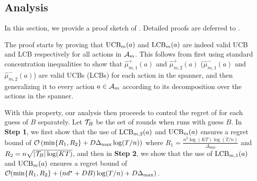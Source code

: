 \subsection{Analysis}\label{sec: alg}
In this section, we provide a proof sketch of . Detailed proofs are deferred to .

The proof starts by proving that ${\operatorname{UCB}}_m(a)$ and ${\operatorname{LCB}}_m(a)$ are indeed valid UCB and LCB respectively for all actions in ${\mathcal{A}}_m$. 
This follows from first using standard concentration inequalities to show that $\hat{\mu}_{m,1}^+(a)$ and $\hat{\mu}_{m,2}^+(a)$ ($\hat{\mu}_{m,1}^-(a)$ and $\hat{\mu}_{m,2}^-(a)$) are valid UCBs (LCBs) for each action in the spanner, 
and then generalizing it to every action $a \in {\mathcal{A}}_m$ according to its decomposition over the actions in the spanner.

With this property, our analysis then proceeds to control the regret of  for each guess of $B$ separately. Let ${\mathcal{T}}_B$ be the set of rounds when  runs with guess $B$. 
In \textbf{Step 1}, we first show that the use of ${\operatorname{LCB}}_{m,2}(a)$ and ${\operatorname{UCB}}_m(a)$ ensures a regret bound of $\mathcal{O}\left(\min\{R_1,R_2\}+D\Delta_{\max}\log(T/n)\right)$ where $R_1=\frac{n^2\log(KT)\log(T/n)}{\Delta_{\min}}$ and $R_2=n\sqrt{|{\mathcal{T}}_B|\log(KT)}$,
and then in \textbf{Step 2}, we show that the use of ${\operatorname{LCB}}_{m,1}(a)$ and ${\operatorname{UCB}}_m(a)$ ensures a regret bound of
$\mathcal{O}(\min\{R_1,R_2\}+(nd^\star+DB)\log(T/n)+D\Delta_{\max})$.

